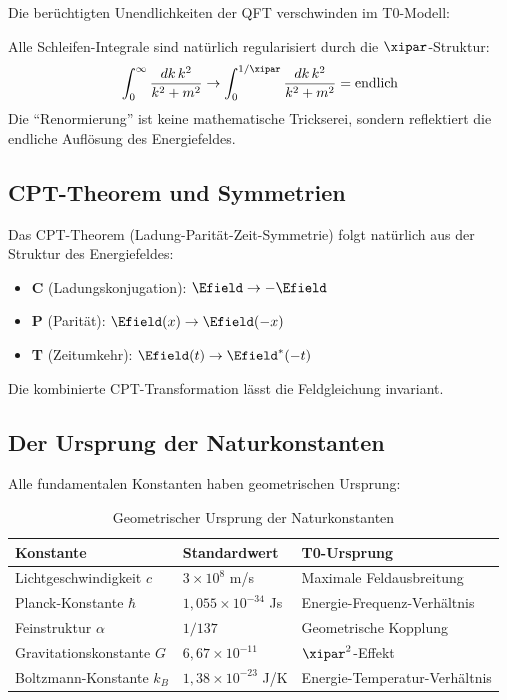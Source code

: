	Die berüchtigten Unendlichkeiten der QFT verschwinden im T0-Modell:
	
	\begin{quantum}
		Alle Schleifen-Integrale sind natürlich regularisiert durch die $\xipar$-Struktur:
		\begin{equation}
			\int_0^\infty \frac{dk \, k^2}{k^2 + m^2} \rightarrow \int_0^{1/\xipar} \frac{dk \, k^2}{k^2 + m^2} = \text{endlich}
		\end{equation}
		Die ``Renormierung'' ist keine mathematische Trickserei, sondern reflektiert die endliche Auflösung des Energiefeldes.
	\end{quantum}
	
	\subsection{CPT-Theorem und Symmetrien}
	
	Das CPT-Theorem (Ladung-Parität-Zeit-Symmetrie) folgt natürlich aus der Struktur des Energiefeldes:
	
	\begin{itemize}
		\item \textbf{C} (Ladungskonjugation): $\Efield \rightarrow -\Efield$
		\item \textbf{P} (Parität): $\Efield(x) \rightarrow \Efield(-x)$
		\item \textbf{T} (Zeitumkehr): $\Efield(t) \rightarrow \Efield^*(-t)$
	\end{itemize}
	
	Die kombinierte CPT-Transformation lässt die Feldgleichung invariant.
	
	\subsection{Der Ursprung der Naturkonstanten}
	
	Alle fundamentalen Konstanten haben geometrischen Ursprung:
	
	\begin{table}[H]
		\centering
		\begin{tabular}{lll}
			\toprule
			\textbf{Konstante} & \textbf{Standardwert} & \textbf{T0-Ursprung} \\
			\midrule
			Lichtgeschwindigkeit $c$ & $3 \times 10^8$ m/s & Maximale Feldausbreitung \\
			Planck-Konstante $\hbar$ & $1,055 \times 10^{-34}$ Js & Energie-Frequenz-Verhältnis \\
			Feinstruktur $\alpha$ & $1/137$ & Geometrische Kopplung \\
			Gravitationskonstante $G$ & $6,67 \times 10^{-11}$ & $\xipar^2$-Effekt \\
			Boltzmann-Konstante $k_B$ & $1,38 \times 10^{-23}$ J/K & Energie-Temperatur-Verhältnis \\
			\bottomrule
		\end{tabular}
		\caption{Geometrischer Ursprung der Naturkonstanten}
	\end{table}
	
